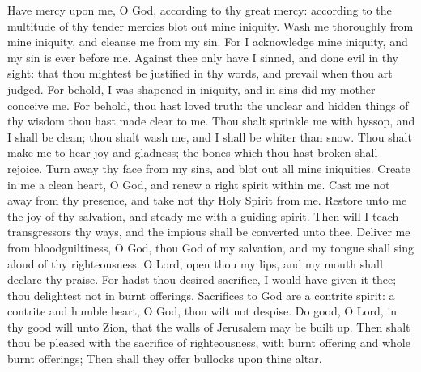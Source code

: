 Have mercy upon me, O God, according to thy great mercy: according to the multitude of thy tender mercies blot out mine iniquity. Wash me thoroughly from mine iniquity, and cleanse me from my sin. For I acknowledge mine iniquity, and my sin is ever before me. Against thee only have I sinned, and done evil in thy sight: that thou mightest be justified in thy words, and prevail when thou art judged. For behold, I was shapened in iniquity, and in sins did my mother conceive me.  For behold, thou hast loved truth: the unclear and hidden things of thy wisdom thou hast made clear to me. Thou shalt sprinkle me with hyssop, and I shall be clean; thou shalt wash me, and I shall be whiter than snow. Thou shalt make me to hear joy and gladness; the bones which thou hast broken shall rejoice. Turn away thy face from my sins, and blot out all mine iniquities. Create in me a clean heart, O God, and renew a right spirit within me. Cast me not away from thy presence, and take not thy Holy Spirit from me. Restore unto me the joy of thy salvation, and steady me with a guiding spirit.  Then will I teach transgressors thy ways, and the impious shall be converted unto thee. Deliver me from bloodguiltiness, O God, thou God of my salvation, and my tongue shall sing aloud of thy righteousness. O Lord, open thou my lips, and my mouth shall declare thy praise. For hadst thou desired sacrifice, I would have given it thee; thou delightest not in burnt offerings. Sacrifices to God are a contrite spirit: a contrite and humble heart, O God, thou wilt not despise. Do good, O Lord, in thy good will unto Zion, that the walls of Jerusalem may be built up. Then shalt thou be pleased with the sacrifice of righteousness, with burnt offering and whole burnt offerings; Then shall they offer bullocks upon thine altar.
